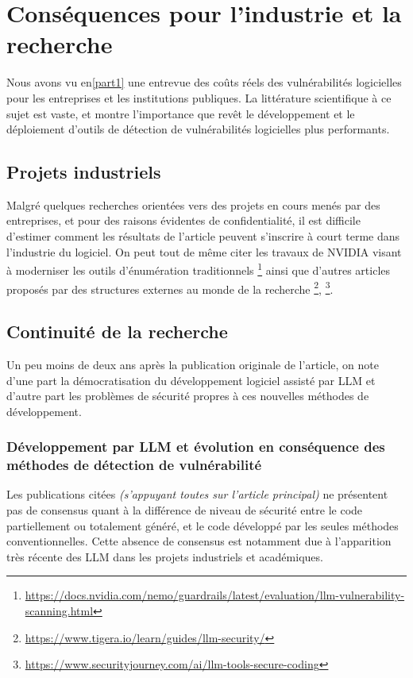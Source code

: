 \chapter{Conséquences pour l'industrie et la recherche}
    Nous avons vu en\ref{part1} une entrevue des coûts réels des vulnérabilités logicielles
    pour les entreprises et les institutions publiques. La littérature scientifique à ce sujet
    est vaste\cite{vuln_cost},\cite{vuln_cost2} et montre l'importance que revêt le
    développement et le déploiement d'outils de détection de vulnérabilités logicielles plus
    performants.
    \section{Projets industriels}
        Malgré quelques recherches orientées vers des projets en cours menés par des
        entreprises, et pour des raisons évidentes de confidentialité, il est difficile
        d'estimer comment les résultats de l'article peuvent s'inscrire à court terme dans
        l'industrie du logiciel. On peut tout de même citer les travaux de NVIDIA visant à
        moderniser les outils d'énumération traditionnels
\footnote{
    \url{https://docs.nvidia.com/nemo/guardrails/latest/evaluation/llm-vulnerability-scanning.html}} ainsi que d'autres articles proposés
        par des structures externes au monde de la recherche \footnote{\url{https://www.tigera.io/learn/guides/llm-security/}},
        \footnote{\url{https://www.securityjourney.com/ai/llm-tools-secure-coding}}.
    \section{Continuité de la recherche}

        Un peu moins de deux ans après la publication originale de l'article, on note d'une part
        la démocratisation du développement logiciel assisté par LLM \cite{citing5} et d'autre
        part les problèmes de sécurité propres à ces nouvelles méthodes de développement\cite{citing1, citing2, citing3, citing4}.
        \subsection{Développement par LLM et évolution en conséquence des méthodes de détection de vulnérabilité}
            Les publications citées \textit{(s'appuyant toutes sur l'article principal)} ne
            présentent pas de consensus quant à la différence de niveau de sécurité entre le code
            partiellement ou totalement généré, et le code développé par les seules méthodes
            conventionnelles. Cette absence de consensus est notamment due à l'apparition très
            récente des LLM dans les projets industriels et académiques.

